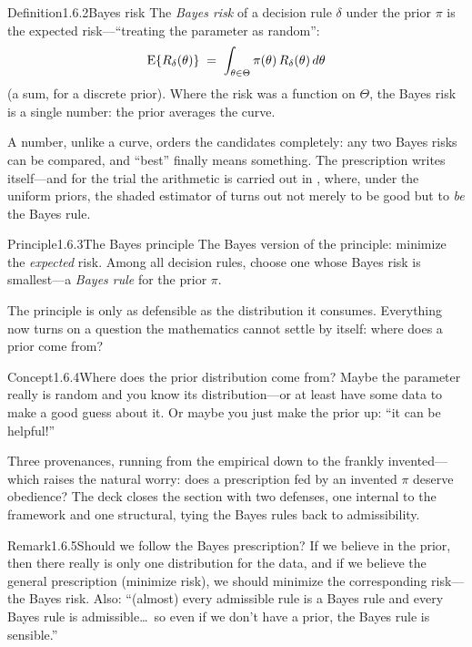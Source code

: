 \documentclass[main.tex]{subfiles}
\begin{document}
\begin{Obj}{Definition}{1.6.2}{Bayes risk}
The \emph{Bayes risk} of a decision rule $\delta$ under the prior $\pi$ is the expected
risk---``treating the parameter as random'':
\[ \mathrm{E}\{R_{\delta}(\theta)\} \;=\; \int_{\theta\in\Theta} \pi(\theta)\,R_{\delta}(\theta)\,d\theta \]
(a sum, for a discrete prior). Where the risk was a function on $\Theta$, the Bayes risk is a
single number: the prior averages the curve.
\end{Obj}

\medskip
A number, unlike a curve, orders the candidates completely: any two Bayes risks can be
compared, and ``best'' finally means something. The prescription writes itself---and for the
trial the arithmetic is carried out in , where, under the uniform priors, the
shaded estimator of  turns out not merely to be good but to \emph{be} the Bayes
rule.

\begin{Obj}{Principle}{1.6.3}{The Bayes principle}
The Bayes version of the principle: minimize the \emph{expected} risk. Among all decision
rules, choose one whose Bayes risk is smallest---a \emph{Bayes rule} for the prior $\pi$.
\end{Obj}

\medskip
The principle is only as defensible as the distribution it consumes. Everything now turns on a
question the mathematics cannot settle by itself: where does a prior come from?

\begin{ObjL}{Concept}{1.6.4}{Where does the prior distribution come from?}
Maybe the parameter really is random and you know its distribution---or at least have some data
to make a good guess about it. Or maybe you just make the prior up: ``it can be helpful!''
\end{ObjL}

\medskip
Three provenances, running from the empirical down to the frankly invented---which raises the
natural worry: does a prescription fed by an invented $\pi$ deserve obedience? The deck closes
the section with two defenses, one internal to the framework and one structural, tying the
Bayes rules back to admissibility.

\begin{ObjL}{Remark}{1.6.5}{Should we follow the Bayes prescription?}
If we believe in the prior, then there really is only one distribution for the data, and if we
believe the general prescription (minimize risk), we should minimize the corresponding
risk---the Bayes risk. Also: ``(almost) every admissible rule is a Bayes rule and every Bayes
rule is admissible\dots\ so even if we don't have a prior, the Bayes rule is
sensible.''
\end{ObjL}
\end{document}
